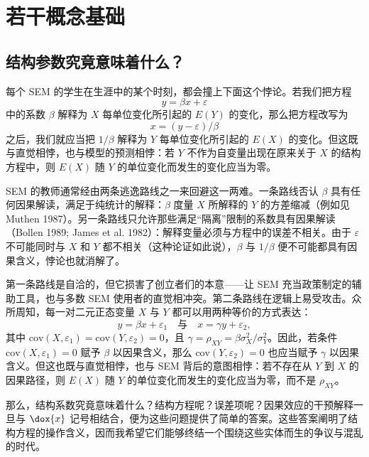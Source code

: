
\section{若干概念基础}

\subsection{结构参数究竟意味着什么？}

每个 SEM 的学生在生涯中的某个时刻，都会撞上下面这个悖论。若我们把方程
\[
y=\beta x+\varepsilon
\]
中的系数 $\beta$ 解释为 $X$ 每单位变化所引起的 $E(Y)$ 的变化，那么把方程改写为
\[
x=(y-\varepsilon)/\beta
\]
之后，我们就应当把 $1/\beta$ 解释为 $Y$ 每单位变化所引起的 $E(X)$ 的变化。但这既与直觉相悖，也与模型的预测相悖：若 $Y$ 不作为自变量出现在原来关于 $X$ 的结构方程中，则 $E(X)$ 随 $Y$ 的单位变化而发生的变化应当为零。

SEM 的教师通常经由两条逃逸路线之一来回避这一两难。一条路线否认 $\beta$ 具有任何因果解读，满足于纯统计的解释：$\beta$ 度量 $X$ 所解释的 $Y$ 的方差缩减（例如见 Muthen 1987）。另一条路线只允许那些满足“隔离”限制的系数具有因果解读（Bollen 1989; James et al. 1982）：解释变量必须与方程中的误差不相关。由于 $\varepsilon$ 不可能同时与 $X$ 和 $Y$ 都不相关（这种论证如此说），$\beta$ 与 $1/\beta$ 便不可能都具有因果含义，悖论也就消解了。

第一条路线是自洽的，但它损害了创立者们的本意——让 SEM 充当政策制定的辅助工具，也与多数 SEM 使用者的直觉相冲突。第二条路线在逻辑上易受攻击。众所周知，每一对二元正态变量 $X$ 与 $Y$ 都可以用两种等价的方式表达：
\[
y=\beta x+\varepsilon_1
\quad\text{与}\quad
x=\gamma y+\varepsilon_2,
\]
其中 $\mathrm{cov}(X,\varepsilon_1)=\mathrm{cov}(Y,\varepsilon_2)=0$，且 $\gamma=\rho_{XY}=\beta\sigma_X^2/\sigma_Y^2$。因此，若条件 $\mathrm{cov}(X,\varepsilon_1)=0$ 赋予 $\beta$ 以因果含义，那么 $\mathrm{cov}(Y,\varepsilon_2)=0$ 也应当赋予 $\gamma$ 以因果含义。但这也既与直觉相悖，也与 SEM 背后的意图相悖：若不存在从 $Y$ 到 $X$ 的因果路径，则 $E(X)$ 随 $Y$ 的单位变化而发生的变化应当为零，而不是 $\rho_{XY}$。

那么，结构系数究竟意味着什么？结构方程呢？误差项呢？因果效应的干预解释一旦与 $\dox{x}$ 记号相结合，便为这些问题提供了简单的答案。这些答案阐明了结构方程的操作含义，因而我希望它们能够终结一个围绕这些实体而生的争议与混乱的时代。

